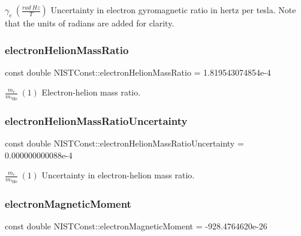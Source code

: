 $\gamma_e \ (\frac{rad\ Hz}{T})$ Uncertainty in electron gyromagnetic ratio in hertz per tesla. Note that the units of radians are added for clarity. \mbox{\label{group___electron_ga5039598cd8a51d15d9dfbb0463c109d6}} 
\subsubsection{\texorpdfstring{electron\+Helion\+Mass\+Ratio}{electronHelionMassRatio}}
{\footnotesize\ttfamily const double N\+I\+S\+T\+Const\+::electron\+Helion\+Mass\+Ratio = 1.\+819543074854e-\/4}

$\frac{m_e}{m_{^3\textrm{He}}} \ (1)$ Electron-\/helion mass ratio. \mbox{\label{group___electron_ga38d8d37bdbda6d2c1ad4165f56901cdc}} 
\subsubsection{\texorpdfstring{electron\+Helion\+Mass\+Ratio\+Uncertainty}{electronHelionMassRatioUncertainty}}
{\footnotesize\ttfamily const double N\+I\+S\+T\+Const\+::electron\+Helion\+Mass\+Ratio\+Uncertainty = 0.\+000000000088e-\/4}

$\frac{m_e}{m_{^3\textrm{He}}} \ (1)$ Uncertainty in electron-\/helion mass ratio. \mbox{\label{group___electron_ga81fc83bd665b7b4fb83e9901ed7d6628}} 
\subsubsection{\texorpdfstring{electron\+Magnetic\+Moment}{electronMagneticMoment}}
{\footnotesize\ttfamily const double N\+I\+S\+T\+Const\+::electron\+Magnetic\+Moment = -\/928.\+4764620e-\/26}

